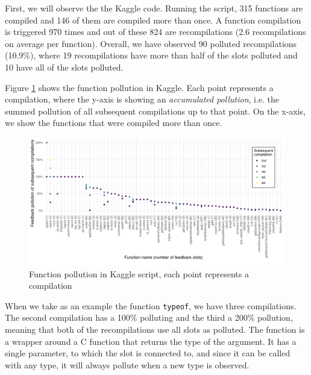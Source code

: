 First, we will observe the the Kaggle code. Running the script, 315 functions are compiled and 146 of them are compiled more than once. A function compilation is triggered 970 times and out of these 824 are recompilations (2.6 recompilations on average per function). Overall, we have observed 90 polluted recompilations (10.9\%), where 19 recompilations have more than half of the slots polluted and 10 have all of the slots polluted.

Figure \ref{fig:kaggle-pollution} shows the function pollution in Kaggle. Each point represents a compilation, where the y-axis is showing an \textit{accumulated pollution}, i.e. the summed pollution of all subsequent compilations up to that point. On the x-axis, we show the functions that were compiled more than once.

\begin{figure}
	\centering
	\begin{adjustwidth}{-2cm}{-2cm}
		\includegraphics[width=1.3\textwidth]{figures/pollution/master/kaggle-function-pollution.pdf}
	\end{adjustwidth}
	\caption{Function pollution in Kaggle script, each point represents a compilation\cite{feedback-vmil}}\label{fig:kaggle-pollution}
\end{figure}

When we take as an example the function \texttt{typeof}, we have three compilations. The second compilation has a 100\% polluting and the third a 200\% pollution, meaning that both of the recompilations use all slots as polluted. The function is a wrapper around a C function that returns the type of the argument. It has a single parameter, to which the slot is connected to, and since it can be called with any type, it will always pollute when a new type is observed.


